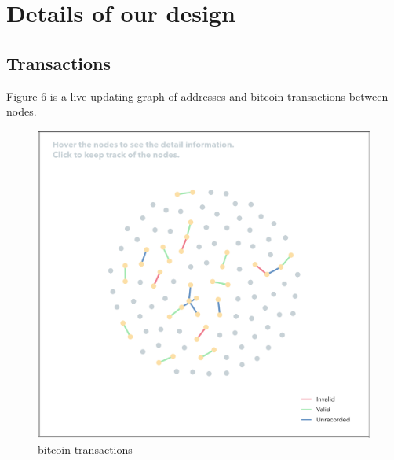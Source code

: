 \documentclass[journal, a4paper]{IEEEtran}
\begin{document}
\section{Details of our design}
\subsection{Transactions}
Figure 6 is a live updating graph of addresses and bitcoin transactions between nodes.
\begin{figure}[!hbt]
		\begin{center}
		\includegraphics[width=\columnwidth]{transactions.png}
		\caption{bitcoin transactions}
		\label{fig:overall_design}
		\end{center}
	\end{figure}
\end{document}
